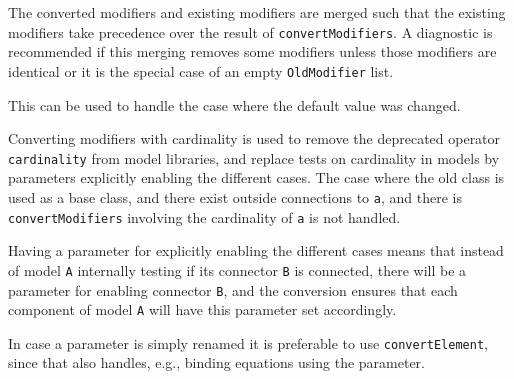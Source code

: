 The converted modifiers and existing modifiers are merged such that the existing modifiers take precedence over the result of \lstinline!convertModifiers!.
A diagnostic is recommended if this merging removes some modifiers unless those modifiers are identical or it is the special case of an empty \lstinline!OldModifier! list.
\begin{nonnormative}
This can be used to handle the case where the default value was changed.
\end{nonnormative}

Converting modifiers with cardinality is used to remove the deprecated operator \lstinline!cardinality! from model libraries, and replace tests on cardinality in models by parameters explicitly enabling the different cases.
The case where the old class is used as a base class, and there exist outside connections to \lstinline!a!, and there is \lstinline!convertModifiers! involving the cardinality of \lstinline!a! is not handled.

\begin{nonnormative}
Having a parameter for explicitly enabling the different cases means that instead of model \lstinline!A! internally testing if its connector \lstinline!B! is connected, there will be a parameter for enabling connector \lstinline!B!, and the conversion ensures that each component of model \lstinline!A! will have this parameter set accordingly.

In case a parameter is simply renamed it is preferable to use \lstinline!convertElement!, since that also handles, e.g., binding equations using the parameter.
\end{nonnormative}

